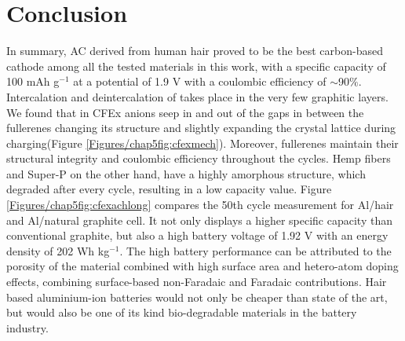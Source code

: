 \newpage
\section{Conclusion}
In summary, AC derived from human hair proved to be the best carbon-based cathode among all the tested materials in this work, with a specific capacity of 100 mAh g$^{-1}$ at a potential of 1.9 V with a coulombic efficiency of $\sim$90$\%$. Intercalation and deintercalation of  takes place in the very few graphitic layers. We found that in CFEx  anions seep in and out of the gaps in between the fullerenes changing its structure and slightly expanding the crystal lattice during charging(Figure \ref{Figures/chap5fig:cfexmech}). Moreover, fullerenes maintain their structural integrity and coulombic efficiency throughout the cycles. Hemp fibers and Super-P on the other hand, have a highly amorphous structure, which degraded after every cycle, resulting in a low capacity value. Figure \ref{Figures/chap5fig:cfexachlong} compares the 50th cycle measurement for Al/hair and Al/natural graphite cell. It not only displays a higher specific capacity than conventional graphite, but also a high battery voltage of 1.92 V with an energy density of 202 Wh kg$^{-1}$. The high battery performance can be attributed to the porosity of the material combined with high surface area and hetero-atom doping effects, combining surface-based non-Faradaic and Faradaic contributions. Hair based aluminium-ion batteries would not only be cheaper than state of the art, but would also be one of its kind bio-degradable materials in the battery industry. 



